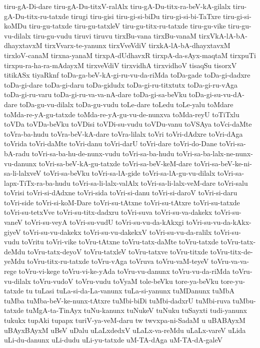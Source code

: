 {tiru-gA-Di-dare
tiru-gA-Du-titxV-ralAlx
tiru-gA-Du-titx-ra-beV-kA-gilalx
tiru-gA-Du-titx-ru-tatxde
tirugi
tiru-gisi
tiru-gi-si-biDu
tiru-gi-si-bi-TaTxre
tiru-gi-si-koMDu
tiru-gu-tatxde
tiru-gu-tatxleV
tiru-gu-titx-ru-tatxde
tiru-gu-vike
tiru-gu-vu-dilalx
tiru-gu-vudu
tiruvi
tiruvu
tirxBu-vana
tirxBu-vanaM
tirxVkA-lA-bA-dhayxtavxM
tirxVvarx-te-yanunx
tirxVveVdiV
tirxkA-lA-bA-dhayxtavxM
tirxloV-canaM
tirxna-yanaM
tirxpA-dUdhavxR
tirxpA-da-sAyx-maqtaM
tirxpuTi
tirxpu-ra-ha-ra-mAdayxM
tirxveVdiV
tirxvidhA
tirxvidhoV
tisaqSu
tisorxV
titikASx
tiyaRknf
toDa-ga-beV-kA-gi-ru-vu-da-riMda
toDa-gade
toDa-gi-dadxre
toDa-gi-dare
toDa-gi-daru
toDa-gidudx
toDa-gi-ru-titxtutx
toDa-gi-ru-vAga
toDa-gi-ru-varu
toDa-gi-ru-va-va-nA-dare
toDa-gi-sa-beVku
toDa-gi-su-vu-dA-dare
toDa-gu-vu-dilalx
toDa-gu-vudu
toLe-dare
toLedu
toLe-yalu
toMdare
toMda-re-yA-gu-tatxde
toMda-re-yA-gu-vu-de-nunxva
toMda-reyU
toTiTxlu
toVDa
toVDa-beVku
toVDisi
toVDi-su-vudu
toVDu-vanu
toVSAya
toVci-daMte
toVra-ba-hudu
toVra-beV-kA-dare
toVra-lilalx
toVri
toVri-dAdxre
toVri-dAga
toVrida
toVri-daMte
toVri-danu
toVri-darU
toVri-dare
toVri-do-Dane
toVri-sa-bA-radu
toVri-sa-ba-hu-de-nunx-vudu
toVri-sa-ba-hudu
toVri-sa-ba-lalx-ne-nunx-vu-danunx
toVri-sa-beV-kA-gu-tatxde
toVri-sa-beV-keM-dare
toVri-sa-beV-ke-ni-sa-li-lalxveV
toVri-sa-beVku
toVri-sa-lA-gide
toVri-sa-lA-gu-vu-dilalx
toVri-sa-lapx-TiTx-ra-ba-hudu
toVri-sa-li-lalx-valAlx
toVri-sa-li-lalx-veM-dare
toVri-salu
toVrisi
toVri-si-dAdxne
toVri-sida
toVri-si-danu
toVri-si-daroV
toVri-si-daru
toVri-side
toVri-si-koM-Dare
toVri-su-tAtxne
toVri-su-tAtxre
toVri-su-tatxde
toVri-su-tetxVve
toVri-su-titx-dadxru
toVri-suva
toVri-su-va-dakekx
toVri-su-vaneV
toVri-su-veyA
toVri-su-vudU
toVri-su-vu-da-kAkxgi
toVri-su-vu-da-kAkx-giyeV
toVri-su-vu-dakekx
toVri-su-vu-dakekxV
toVri-su-vu-da-ralilx
toVri-su-vudu
toVritu
toVri-vike
toVru-tAtxne
toVru-tatx-daMte
toVru-tatxde
toVru-tatx-deMdu
toVru-tatx-deyoV
toVru-tatxleV
toVru-tatxve
toVru-titxde
toVru-titx-de-yeMdu
toVru-titx-ru-tatxde
toVru-vAga
toVruva
toVru-vaM-teyeV
toVru-va-va-rege
toVru-vi-kege
toVru-vi-ke-yAda
toVru-vu-danunx
toVru-vu-da-riMda
toVru-vu-dilalx
toVru-vudoV
toVru-vudu
toVyaM
tole-beVku
tore-ya-beVku
tore-yu-tatxde
tu
tuLasi
tuLa-si-da-La-vanunx
tuLa-si-yanunx
tuMDanunx
tuMbA
tuMba
tuMba-beV-ke-nunx-tAtxre
tuMbi-biDi
tuMbi-dadxrU
tuMbi-ruva
tuMbu-tatxde
tuMgA-ta-TinAyx
tuNu-kanunx
tuNukeV
tuNuku
tuSayxti
tudi-yanunx
tukukx
tupAki
tupapx
turiV-ya-veM-daru
tw
twvxpa-ni-SadaM
u
uBABAyxM
uBAyxBAyxM
uBeV
uDalu
uLaLxdedxV
uLaLx-va-reMdu
uLaLx-vareV
uLida
uLi-du-danunx
uLi-dudu
uLi-yu-tatxde
uM-TA-dAga
uM-TA-dA-galeV
}
